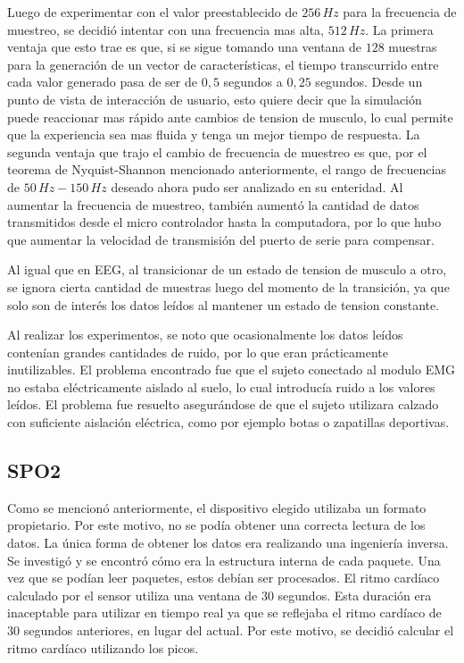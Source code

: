 Luego de experimentar con el valor preestablecido de $256\,Hz$ para la frecuencia de muestreo, se decidió intentar con una frecuencia mas alta, $512\,Hz$. La primera ventaja que esto trae es que, si se sigue tomando una ventana de $128$ muestras para la generación de un vector de características, el tiempo transcurrido entre cada valor generado pasa de ser de $0,5$ segundos a $0,25$ segundos. Desde un punto de vista de interacción de usuario, esto quiere decir que la simulación puede reaccionar mas rápido ante cambios de tension de musculo, lo cual permite que la experiencia sea mas fluida y tenga un mejor tiempo de respuesta. La segunda ventaja que trajo el cambio de frecuencia de muestreo es que, por el teorema de Nyquist-Shannon mencionado anteriormente, el rango de frecuencias de $50 \, Hz-150 \, Hz$ deseado ahora pudo ser analizado en su enteridad. Al aumentar la frecuencia de muestreo, también aumentó la cantidad de datos transmitidos desde el micro controlador hasta la computadora, por lo que hubo que aumentar la velocidad de transmisión del puerto de serie para compensar.

Al igual que en EEG, al transicionar de un estado de tension de musculo a otro, se ignora cierta cantidad de muestras luego del momento de la transición, ya que solo son de interés los datos leídos al mantener un estado de tension constante. 

Al realizar los experimentos, se noto que ocasionalmente los datos leídos contenían grandes cantidades de ruido, por lo que eran prácticamente inutilizables. El problema encontrado fue que el sujeto conectado al modulo EMG no estaba eléctricamente aislado al suelo, lo cual introducía ruido a los valores leídos. El problema fue resuelto asegurándose de que el sujeto utilizara calzado con suficiente aislación eléctrica, como por ejemplo botas o zapatillas deportivas.

\subsection{SPO2}

Como se mencionó anteriormente, el dispositivo elegido utilizaba un formato propietario. Por este motivo, no se podía obtener una correcta lectura de los datos. La única forma de obtener los datos era realizando una ingeniería inversa. Se investigó y se encontró  cómo era la estructura interna de cada paquete. Una vez que se podían leer paquetes, estos debían ser procesados. El ritmo cardíaco calculado por el sensor utiliza una ventana de 30 segundos. Esta duración era inaceptable para utilizar en tiempo real ya que se reflejaba el ritmo cardíaco de 30 segundos anteriores, en lugar del actual. Por este motivo, se decidió calcular el ritmo cardíaco utilizando los picos.

